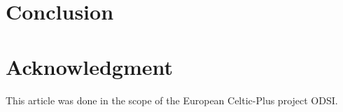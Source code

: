 \documentclass[conference]{IEEEtran}
\begin{document}

\section{Conclusion}





\section*{Acknowledgment}
This article was done in the scope of the European Celtic-Plus project ODSI.  







%
%
%

%
%
\end{document}
